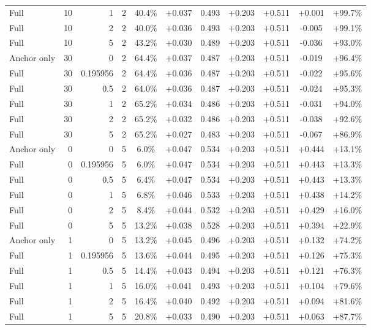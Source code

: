 \begin{table}[htbp]
\begin{tabular}{lrrrccccccc}
Full & 10 & 1 & 2 & 40.4\% & +0.037 & 0.493 & +0.203 & +0.511 & +0.001 & +99.7\% \\
Full & 10 & 2 & 2 & 40.0\% & +0.036 & 0.493 & +0.203 & +0.511 & -0.005 & +99.1\% \\
Full & 10 & 5 & 2 & 43.2\% & +0.030 & 0.489 & +0.203 & +0.511 & -0.036 & +93.0\% \\
Anchor only & 30 & 0 & 2 & 64.4\% & +0.037 & 0.487 & +0.203 & +0.511 & -0.019 & +96.4\% \\
Full & 30 & 0.195956 & 2 & 64.4\% & +0.036 & 0.487 & +0.203 & +0.511 & -0.022 & +95.6\% \\
Full & 30 & 0.5 & 2 & 64.0\% & +0.036 & 0.487 & +0.203 & +0.511 & -0.024 & +95.3\% \\
Full & 30 & 1 & 2 & 65.2\% & +0.034 & 0.486 & +0.203 & +0.511 & -0.031 & +94.0\% \\
Full & 30 & 2 & 2 & 65.2\% & +0.032 & 0.486 & +0.203 & +0.511 & -0.038 & +92.6\% \\
Full & 30 & 5 & 2 & 65.2\% & +0.027 & 0.483 & +0.203 & +0.511 & -0.067 & +86.9\% \\
Anchor only & 0 & 0 & 5 & 6.0\% & +0.047 & 0.534 & +0.203 & +0.511 & +0.444 & +13.1\% \\
Full & 0 & 0.195956 & 5 & 6.0\% & +0.047 & 0.534 & +0.203 & +0.511 & +0.443 & +13.3\% \\
Full & 0 & 0.5 & 5 & 6.4\% & +0.047 & 0.534 & +0.203 & +0.511 & +0.443 & +13.3\% \\
Full & 0 & 1 & 5 & 6.8\% & +0.046 & 0.533 & +0.203 & +0.511 & +0.438 & +14.2\% \\
Full & 0 & 2 & 5 & 8.4\% & +0.044 & 0.532 & +0.203 & +0.511 & +0.429 & +16.0\% \\
Full & 0 & 5 & 5 & 13.2\% & +0.038 & 0.528 & +0.203 & +0.511 & +0.394 & +22.9\% \\
Anchor only & 1 & 0 & 5 & 13.2\% & +0.045 & 0.496 & +0.203 & +0.511 & +0.132 & +74.2\% \\
Full & 1 & 0.195956 & 5 & 13.6\% & +0.044 & 0.495 & +0.203 & +0.511 & +0.126 & +75.3\% \\
Full & 1 & 0.5 & 5 & 14.4\% & +0.043 & 0.494 & +0.203 & +0.511 & +0.121 & +76.3\% \\
Full & 1 & 1 & 5 & 16.0\% & +0.041 & 0.493 & +0.203 & +0.511 & +0.104 & +79.6\% \\
Full & 1 & 2 & 5 & 16.4\% & +0.040 & 0.492 & +0.203 & +0.511 & +0.094 & +81.6\% \\
Full & 1 & 5 & 5 & 20.8\% & +0.033 & 0.490 & +0.203 & +0.511 & +0.063 & +87.7\% \\

\end{tabular}
\end{table}
